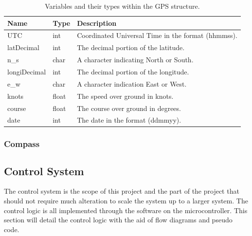 	\begin{table}[!ht]
		\begin{center}
			\caption{Variables and their types within the GPS structure.}
			\label{tab:3:GPSstruct}
			\begin{tabular}{|l|l|l|}
				\hline
				\textbf{Name} & \textbf{Type} & \textbf{Description} \\
				\hline
				UTC & int & Coordinated Universal Time in the format (hhmmss). \\
				\hline
				latDecimal & int & The decimal portion of the latitude. \\
				\hline
				n\_s & char & A character indicating North or South. \\
				\hline 
				longiDecimal & int & The decimal portion of the longitude. \\
				\hline 
				e\_w & char & A character indication East or West. \\
				\hline
				knots & float & The speed over ground in knots. \\
				\hline
				course & float & The course over ground in degrees. \\
				\hline
				date & int & The date in the format (ddmmyy). \\
				\hline
			\end{tabular}
		\end{center}
	\end{table}
	\subsubsection{Compass}
	
	\subsection{Control System}
	The control system is the scope of this project and the part of the project that should not require much alteration to scale the system up to a larger system. The control logic  is all implemented through the software on the microcontroller. This section will detail the control logic with the aid of flow diagrams and pseudo code. 
